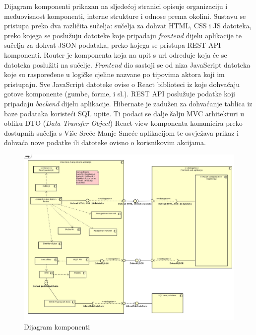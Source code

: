 			Dijagram komponenti prikazan na sljedećoj stranici opisuje organizaciju i međuovisnost komponenti, interne strukture i odnose prema okolini. Sustavu se pristupa preko dva različita sučelja: sučelja za dohvat HTML, CSS i JS datoteka, preko kojega se poslužuju datoteke koje pripadaju \textit{frontend} dijelu aplikacije te sučelja za dohvat JSON podataka, preko kojega se pristupa REST API komponenti. Router je komponenta koja na upit s url određuje koja će se datoteka poslužiti na sučelje. \textit{Frontend} dio sastoji se od niza JavaScript datoteka koje su raspoređene u logičke cjeline nazvane po tipovima aktora koji im pristupaju. Sve JavaScript datoteke ovise o React biblioteci iz koje dohvaćaju gotove komponente (gumbe, forme, i sl.). REST API poslužuje podatke koji pripadaju \textit{backend} dijelu aplikacije. Hibernate je zadužen za dohvaćanje tablica iz baze podataka koristeći SQL upite. Ti podaci se dalje šalju MVC arhitekturi u obliku DTO (\textit{Data Transfer Object}) React-view komponenta komunicira preko dostupnih sučelja s Više Sreće Manje Smeće aplikacijom te osvježava prikaz i dohvaća nove podatke ili datoteke ovisno o korisnikovim akcijama.


			\eject

			\begin{figure}
				\centering
				\includegraphics[width=1.0\linewidth]{slike/ComponentDiagram}
				\caption{Dijagram komponenti}
				\label{fig:ComponentDiagram}
			\end{figure}

			\clearpage
			\eject